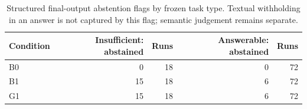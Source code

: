 \begin{table}[!ht]
\centering
\small
\caption[Structured final-output abstention flags by frozen task type]{Structured final-output abstention flags by frozen task type. Textual withholding in an answer is not captured by this flag; semantic judgement remains separate.}
\label{tab:logged-abstention}
\begin{tabular}{lrrrr}
\toprule
Condition & Insufficient: abstained & Runs & Answerable: abstained & Runs \\
\midrule
B0 & 0 & 18 & 0 & 72 \\
B1 & 15 & 18 & 6 & 72 \\
G1 & 15 & 18 & 6 & 72 \\
\bottomrule
\end{tabular}
\end{table}
